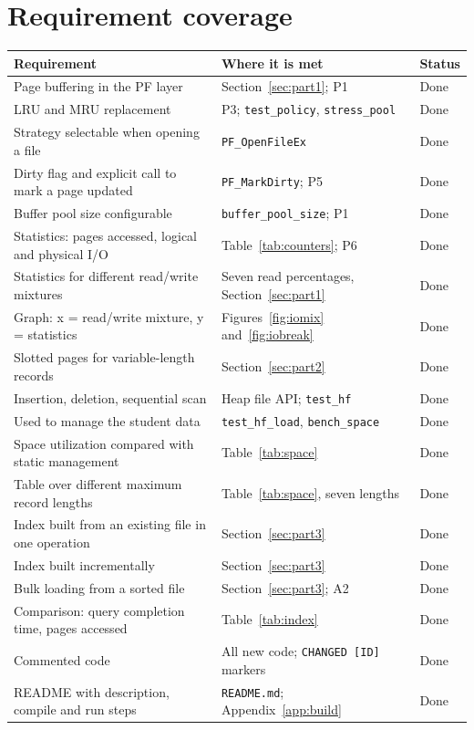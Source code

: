 \documentclass[11pt,a4paper]{article}
\begin{document}
\section{Requirement coverage}

\small
\begin{longtable}{>{\raggedright\arraybackslash}p{6.6cm}>{\raggedright\arraybackslash}p{5.6cm}l}
\toprule
Requirement & Where it is met & Status \\
\midrule
\endhead
Page buffering in the PF layer & Section~\ref{sec:part1}; P1 & Done \\
LRU and MRU replacement & P3; \texttt{test\_policy}, \texttt{stress\_pool} & Done \\
Strategy selectable when opening a file & \texttt{PF\_OpenFileEx} & Done \\
Dirty flag and explicit call to mark a page updated & \texttt{PF\_MarkDirty}; P5 & Done \\
Buffer pool size configurable & \texttt{buffer\_pool\_size}; P1 & Done \\
Statistics: pages accessed, logical and physical I/O & Table~\ref{tab:counters}; P6 & Done \\
Statistics for different read/write mixtures & Seven read percentages, Section~\ref{sec:part1} & Done \\
Graph: x = read/write mixture, y = statistics & Figures~\ref{fig:iomix} and~\ref{fig:iobreak} & Done \\
Slotted pages for variable-length records & Section~\ref{sec:part2} & Done \\
Insertion, deletion, sequential scan & Heap file API; \texttt{test\_hf} & Done \\
Used to manage the student data & \texttt{test\_hf\_load}, \texttt{bench\_space} & Done \\
Space utilization compared with static management & Table~\ref{tab:space} & Done \\
Table over different maximum record lengths & Table~\ref{tab:space}, seven lengths & Done \\
Index built from an existing file in one operation & Section~\ref{sec:part3} & Done \\
Index built incrementally & Section~\ref{sec:part3} & Done \\
Bulk loading from a sorted file & Section~\ref{sec:part3}; A2 & Done \\
Comparison: query completion time, pages accessed & Table~\ref{tab:index} & Done \\
Commented code & All new code; \texttt{CHANGED [ID]} markers & Done \\
README with description, compile and run steps & \texttt{README.md}; Appendix~\ref{app:build} & Done \\
\bottomrule
\end{longtable}
\normalsize
\end{document}
